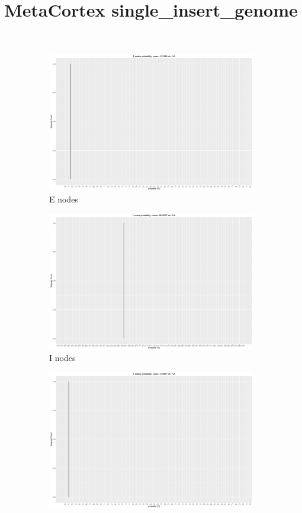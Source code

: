 \documentclass[a4paper, 12pt, oneside]{article}
\title{\large{MetaCortex single_insert_genome}}
\begin{document}
\maketitle

\begin{figure}[h]
\centering
\begin{subfigure}[b]{0.45\textwidth}
\includegraphics[width=\textwidth]{graphs/E_degrees.png}
\caption{\label{fig:E}E nodes}
\end{subfigure}
\begin{subfigure}[b]{0.45\textwidth}
\includegraphics[width=\textwidth]{graphs/I_degrees.png}
\caption{\label{fig:I}I nodes }
\end{subfigure}
\begin{subfigure}[b]{0.45\textwidth}
\includegraphics[width=\textwidth]{graphs/X_degrees.png}

\end{subfigure}
\end{figure}
\end{document}
